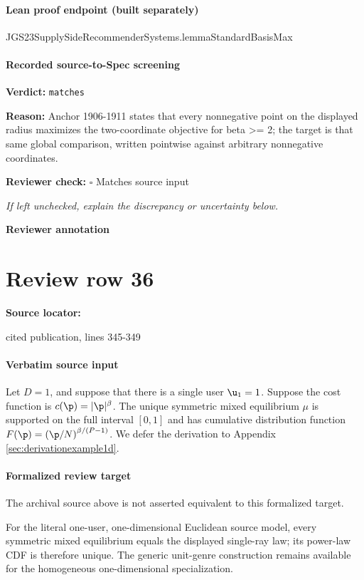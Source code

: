 \documentclass[10pt]{article}
\newcommand{\reviewerbox}{%
  \par\noindent\fbox{\parbox{0.96\linewidth}{\rule{0pt}{0.38in}}}\par
}
\newcommand{\reviewmatch}[1]{%
  \par\noindent\textbf{Reviewer check:} $\square$\; #1\par
  \noindent\emph{If left unchecked, explain the discrepancy or uncertainty below.}\par
}
\begin{document}
\paragraph{Lean proof endpoint (built separately)}\begin{ReviewVerbatim}
JGS23SupplySideRecommenderSystems.lemmaStandardBasisMax
\end{ReviewVerbatim}

\paragraph{Recorded source-to-Spec screening}
\textbf{Verdict:} \texttt{matches}
\\
{\raggedright
\textbf{Reason:} Anchor 1906-\allowbreak{}1911 states that every nonnegative point on the displayed radius maximizes the two-\allowbreak{}coordinate objective for beta >= 2;\allowbreak{} the target is that same global comparison, written pointwise against arbitrary nonnegative coordinates.\allowbreak{}
\par}
\reviewmatch{Matches source input}
\noindent\textbf{Reviewer annotation}\par
\reviewerbox
\clearpage
\hypertarget{source-claim-409c9e3520b8aea8}{}
\section*{Review row 36}
\textbf{Source locator:} {\footnotesize\raggedright cited publication, lines 345-\allowbreak{}349\par}
\paragraph{Verbatim source input}
\begin{ReviewVerbatim}
\begin{example}
\label{example:1d}
Let $D = 1$, and suppose that there is a single user $\u_1 =1$. Suppose the cost function is $c(\p) = |\p|^{\beta}$. The unique symmetric mixed equilibrium $\mu$ is supported on the full interval $[0, 1]$ and has cumulative distribution function $F(\p) = \left(\p /N\right)^{\beta / (P-1)}$. We defer the derivation to Appendix \ref{sec:derivationexample1d}.
\end{example}
\end{ReviewVerbatim}


\paragraph{Formalized review target}
The archival source above is not asserted equivalent to this formalized target.
\begin{ReviewVerbatim}
For the literal one-user, one-dimensional Euclidean source model, every symmetric mixed equilibrium equals the displayed single-ray law; its power-law CDF is therefore unique. The generic unit-genre construction remains available for the homogeneous one-dimensional specialization.
\end{ReviewVerbatim}
\end{document}
